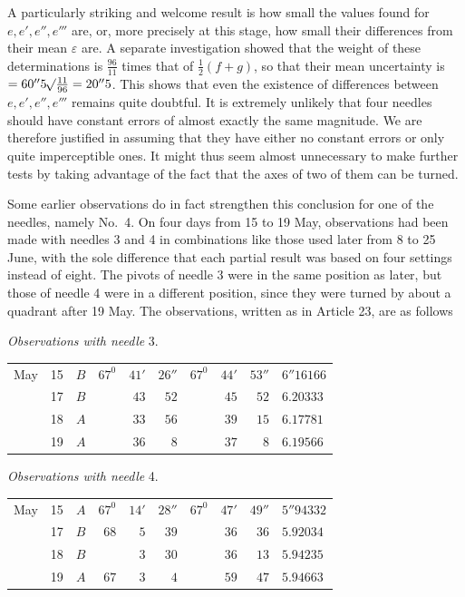 A particularly striking and welcome result is how small the values found for $e,e',e'',e'''$ are, or, more precisely at this stage, how small their differences from their mean $\varepsilon$ are. A separate investigation showed that the weight of these determinations is $\frac{96}{11}$ times that of $\tfrac12(f+g)$, so that their mean uncertainty is $=60''5\mathord{{}^{}\!\surd}\frac{11}{96}=20''5$. This shows that even the existence of differences between $e,e',e'',e'''$ remains quite doubtful. It is extremely unlikely that four needles should have constant errors of almost exactly the same magnitude. We are therefore justified in assuming that they have either no constant errors or only quite imperceptible ones. It might thus seem almost unnecessary to make further tests by taking advantage of the fact that the axes of two of them can be turned.

Some earlier observations do in fact strengthen this conclusion for one of the needles, namely No.\ 4. On four days from 15 to 19 May, observations had been made with needles 3 and 4 in combinations like those used later from 8 to 25 June, with the sole difference that each partial result was based on four settings instead of eight. The pivots of needle 3 were in the same position as later, but those of needle 4 were in a different position, since they were turned by about a quadrant after 19 May. The observations, written as in Article 23, are as follows

\begin{center}\textit{Observations with needle} 3.

\begin{tabular}{rr|c|rrr|rrr|l}
May&15&$B$&$67^0$&$41'$&$26''$&$67^0$&$44'$&$53''$&$6''16166$\\
&17&$B$&&$43$&$52$&&$45$&$52$&$6.20333$\\
&18&$A$&&$33$&$56$&&$39$&$15$&$6.17781$\\
&19&$A$&&$36$&$8$&&$37$&$8$&$6.19566$
\end{tabular}
\end{center}
\begin{center}\textit{Observations with needle} 4.

\begin{tabular}{rr|c|rrr|rrr|l}
May&15&$A$&$67^0$&$14'$&$28''$&$67^0$&$47'$&$49''$&$5''94332$\\
&17&$B$&$68$&$5$&$39$&&$36$&$36$&$5.92034$\\
&18&$B$&&$3$&$30$&&$36$&$13$&$5.94235$\\
&19&$A$&$67$&$3$&$4$&&$59$&$47$&$5.94663$
\end{tabular}
\end{center}

